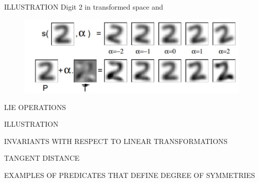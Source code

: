 \documentclass[11pt]{beamer}
\begin{document}
\begin{frame}{ILLUSTRATION}
Digit 2 in transformed space and 
\begin{figure}
\centering
\includegraphics[width=1\linewidth]{Imgs/lie.png}\\
\end{figure}
\end{frame}


\begin{frame}{LIE OPERATIONS}

\end{frame}

\begin{frame}{ILLUSTRATION}

\end{frame}


\begin{frame}{INVARIANTS WITH RESPECT TO LINEAR TRANSFORMATIONS}

\end{frame}


\begin{frame}{TANGENT DISTANCE}

\end{frame}

\begin{frame}{EXAMPLES OF PREDICATES THAT DEFINE DEGREE OF SYMMETRIES}

\end{frame}
\end{document}
